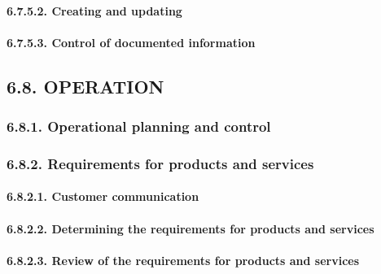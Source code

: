 \documentclass[
]{article}
\begin{document}
\hypertarget{creating-and-updating-1}{%
\paragraph{6.7.5.2. Creating and
updating}\label{creating-and-updating-1}}

\hypertarget{control-of-documented-information-1}{%
\paragraph{6.7.5.3. Control of documented
information}\label{control-of-documented-information-1}}

\hypertarget{operation-1}{%
\subsection{6.8. OPERATION}\label{operation-1}}

\hypertarget{operational-planning-and-control-1}{%
\subsubsection{6.8.1. Operational planning and
control}\label{operational-planning-and-control-1}}

\hypertarget{requirements-for-products-and-services-1}{%
\subsubsection{6.8.2. Requirements for products and
services}\label{requirements-for-products-and-services-1}}

\hypertarget{customer-communication-1}{%
\paragraph{6.8.2.1. Customer
communication}\label{customer-communication-1}}

\hypertarget{determining-the-requirements-for-products-and-services-1}{%
\paragraph{6.8.2.2. Determining the requirements for products and
services}\label{determining-the-requirements-for-products-and-services-1}}

\hypertarget{review-of-the-requirements-for-products-and-services-1}{%
\paragraph{6.8.2.3. Review of the requirements for products and
services}\label{review-of-the-requirements-for-products-and-services-1}}
\end{document}
